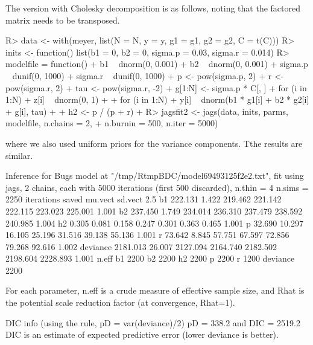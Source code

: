 \documentclass[article]{jss}
\begin{document}
%
The version with Cholesky decomposition is as follows, noting that the 
factored matrix needs to be transposed.
%
\begin{Schunk}
\begin{Sinput}
R> data <- with(meyer, list(N = N, y = y, g1 = g1, g2 = g2, C = t(C)))
R> inits <- function() list(b1 = 0, b2 = 0, sigma.p = 0.03, sigma.r = 0.014)
R> modelfile = function() {
+    b1 ~ dnorm(0, 0.001)
+    b2 ~ dnorm(0, 0.001)
+    sigma.p ~ dunif(0, 1000)
+    sigma.r ~ dunif(0, 1000)
+    p <- pow(sigma.p, 2)
+    r <- pow(sigma.r, 2)
+    tau <- pow(sigma.r, -2)
+    g[1:N] <- sigma.p * C[, ] %
+    for (i in 1:N) { 
+      z[i] ~ dnorm(0, 1) 
+    }
+    for (i in 1:N) { 
+      y[i] ~ dnorm(b1 * g1[i] + b2 * g2[i] + g[i], tau) 
+    }
+    h2 <- p / (p + r)
+  }
R> jagsfit2 <- jags(data, inits, parms, modelfile, n.chains = 2, 
+    n.burnin = 500, n.iter = 5000)
\end{Sinput}
\end{Schunk}
%
where we also used uniform priors for the variance components. Tthe
results are similar.
%
\begin{Schunk}
\begin{Soutput}
Inference for Bugs model at "/tmp/RtmpBDC/model69493125f2e2.txt", fit using
 jags, 2 chains, each with 5000 iterations (first 500 discarded), n.thin = 4
 n.sims = 2250 iterations saved
          mu.vect sd.vect     2.5%
b1        222.131   1.422  219.462  221.142  222.115  223.023  225.001 1.001
b2        237.450   1.749  234.014  236.310  237.479  238.592  240.985 1.004
h2          0.305   0.081    0.158    0.247    0.301    0.363    0.465 1.001
p          32.690  10.297   16.105   25.196   31.516   39.138   55.136 1.001
r          73.642   8.845   57.751   67.597   72.856   79.268   92.616 1.002
deviance 2181.013  26.007 2127.094 2164.740 2182.502 2198.604 2228.893 1.001
         n.eff
b1        2200
b2        2200
h2        2200
p         2200
r         1200
deviance  2200

For each parameter, n.eff is a crude measure of effective sample size,
and Rhat is the potential scale reduction factor (at convergence, Rhat=1).

DIC info (using the rule, pD = var(deviance)/2)
pD = 338.2 and DIC = 2519.2
DIC is an estimate of expected predictive error (lower deviance is better).
\end{Soutput}
\end{Schunk}
%
\end{document}
